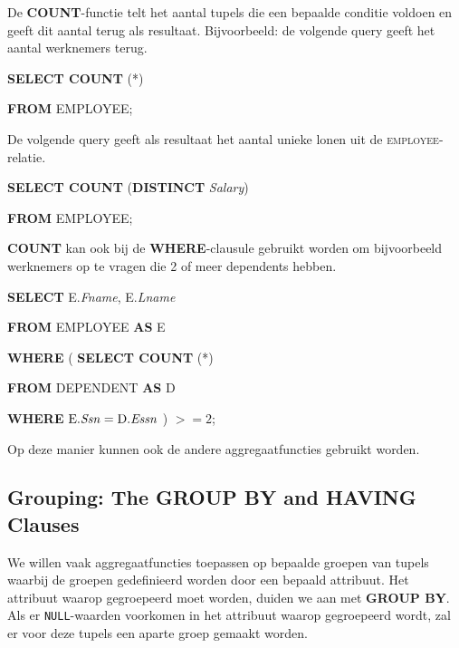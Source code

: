 De \textbf{COUNT}-functie telt het aantal tupels die een bepaalde conditie voldoen en geeft dit aantal terug als resultaat. Bijvoorbeeld: de volgende query geeft het aantal werknemers terug.

\vspace{1mm}\hspace{10mm}
\textbf{SELECT COUNT} (*)

\hspace{10mm}
\textbf{FROM} EMPLOYEE;
\vspace{3mm}

\noindent De volgende query geeft als resultaat het aantal unieke lonen uit de \textsc{employee}-relatie.

\vspace{1mm}\hspace{10mm}
\textbf{SELECT COUNT} (\textbf{DISTINCT} \textit{Salary})

\hspace{10mm}
\textbf{FROM} EMPLOYEE;
\vspace{3mm}

\noindent \textbf{COUNT} kan ook bij de \textbf{WHERE}-clausule gebruikt worden om bijvoorbeeld werknemers op te vragen die 2 of meer dependents hebben.

\vspace{1mm}\hspace{10mm}
\textbf{SELECT} E.\textit{Fname}, E.\textit{Lname}

\hspace{10mm}
\textbf{FROM} EMPLOYEE \textbf{AS} E

\hspace{10mm}
\textbf{WHERE} ( \textbf{SELECT COUNT} (*)

\hspace{10mm}
 \textbf{FROM} DEPENDENT \textbf{AS} D

\hspace{10mm}
 \textbf{WHERE} $\text{E.\textit{Ssn}} = \text{D.\textit{Essn}}$ ) $>= 2$;
\vspace{3mm}

\noindent Op deze manier kunnen ook de andere aggregaatfuncties gebruikt worden.


\subsection{Grouping: The GROUP BY and HAVING Clauses}
We willen vaak aggregaatfuncties toepassen op bepaalde groepen van tupels waarbij de groepen gedefinieerd worden door een bepaald attribuut. Het attribuut waarop gegroepeerd moet worden, duiden we aan met \textbf{GROUP BY}. Als er \texttt{NULL}-waarden voorkomen in het attribuut waarop gegroepeerd wordt, zal er voor deze tupels een aparte groep gemaakt worden.

